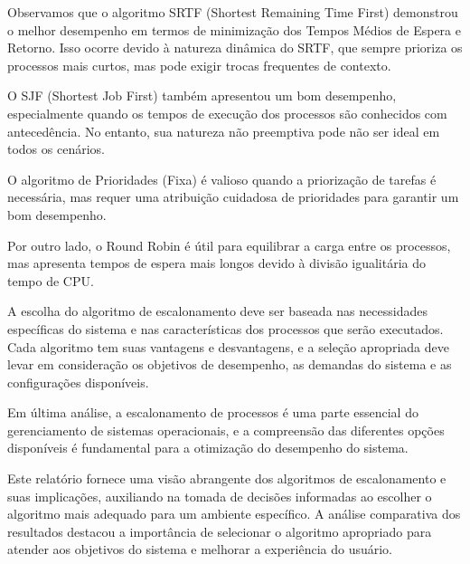 \documentclass[
	12pt,				%
	openright,			%
	oneside,			%
	a4paper,			%
	chapter=TITLE,		%
	english,			%
	french,				%
	spanish,			%
	brazil				%
	]{abntex2}
\theoremstyle{definition}
\begin{document}
Observamos que o algoritmo SRTF (Shortest Remaining Time First) demonstrou o melhor desempenho em termos de minimização dos Tempos Médios de Espera e Retorno. Isso ocorre devido à natureza dinâmica do SRTF, que sempre prioriza os processos mais curtos, mas pode exigir trocas frequentes de contexto.

O SJF (Shortest Job First) também apresentou um bom desempenho, especialmente quando os tempos de execução dos processos são conhecidos com antecedência. No entanto, sua natureza não preemptiva pode não ser ideal em todos os cenários.

O algoritmo de Prioridades (Fixa) é valioso quando a priorização de tarefas é necessária, mas requer uma atribuição cuidadosa de prioridades para garantir um bom desempenho.

Por outro lado, o Round Robin é útil para equilibrar a carga entre os processos, mas apresenta tempos de espera mais longos devido à divisão igualitária do tempo de CPU.

A escolha do algoritmo de escalonamento deve ser baseada nas necessidades específicas do sistema e nas características dos processos que serão executados. Cada algoritmo tem suas vantagens e desvantagens, e a seleção apropriada deve levar em consideração os objetivos de desempenho, as demandas do sistema e as configurações disponíveis.

Em última análise, a escalonamento de processos é uma parte essencial do gerenciamento de sistemas operacionais, e a compreensão das diferentes opções disponíveis é fundamental para a otimização do desempenho do sistema.

Este relatório fornece uma visão abrangente dos algoritmos de escalonamento e suas implicações, auxiliando na tomada de decisões informadas ao escolher o algoritmo mais adequado para um ambiente específico. A análise comparativa dos resultados destacou a importância de selecionar o algoritmo apropriado para atender aos objetivos do sistema e melhorar a experiência do usuário.


\postextual



\cite{tanenbaum2010sistemas}
\end{document}
